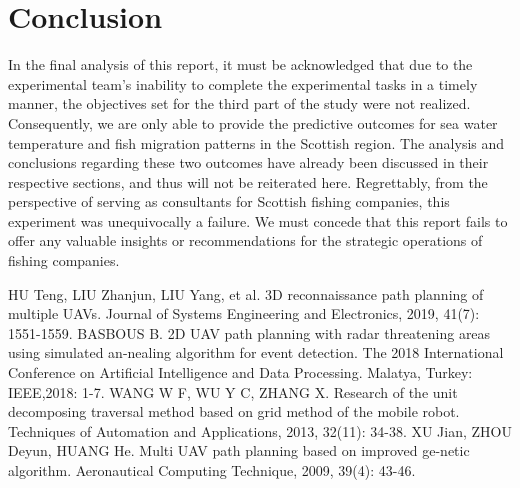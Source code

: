 \documentclass[12pt]{article}  %
\begin{document}
\section{Conclusion}
In the final analysis of this report, it must be acknowledged that due to the experimental team's inability to complete the experimental tasks in a timely manner, the objectives set for the third part of the study were not realized. Consequently, we are only able to provide the predictive outcomes for sea water temperature and fish migration patterns in the Scottish region. The analysis and conclusions regarding these two outcomes have already been discussed in their respective sections, and thus will not be reiterated here. Regrettably, from the perspective of serving as consultants for Scottish fishing companies, this experiment was unequivocally a failure. We must concede that this report fails to offer any valuable insights or recommendations for the strategic operations of fishing companies.


\clearpage   %
\begin{thebibliography}{99}
	 HU Teng, LIU Zhanjun, LIU Yang, et al. 3D reconnaissance path planning of multiple UAVs. Journal of Systems Engineering and Electronics, 2019, 41(7): 1551-1559.
	 BASBOUS B. 2D UAV path planning with radar threatening areas using simulated an-nealing algorithm for event detection. The 2018 International Conference on Artificial Intelligence and Data Processing. Malatya, Turkey: IEEE,2018: 1-7.
	 WANG W F, WU Y C, ZHANG X. Research of the unit decomposing traversal method based on grid method of the mobile robot. Techniques of Automation and Applications, 2013, 32(11): 34-38.
	 XU Jian, ZHOU Deyun, HUANG He. Multi UAV path planning based on improved ge-netic algorithm. Aeronautical Computing Technique, 2009, 39(4): 43-46.

\end{thebibliography}
%  
\end{document}
